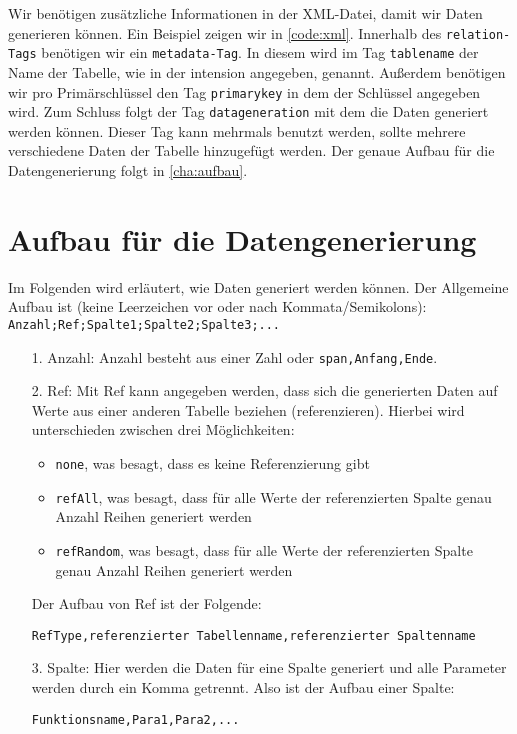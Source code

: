 \documentclass[11pt]{report}
\begin{document}
Wir benötigen zusätzliche Informationen in der XML-Datei, damit wir Daten generieren können. Ein Beispiel zeigen wir in \autoref{code:xml}. Innerhalb des \texttt{relation-Tags} benötigen wir ein \texttt{metadata-Tag}. In diesem wird im Tag \texttt{tablename} der Name der Tabelle, wie in der intension angegeben, genannt. Außerdem benötigen wir pro Primärschlüssel den Tag \texttt{primarykey} in dem der Schlüssel angegeben wird. Zum Schluss folgt der Tag \texttt{datageneration} mit dem die Daten generiert werden können. Dieser Tag kann mehrmals benutzt werden, sollte mehrere verschiedene Daten der Tabelle hinzugefügt werden. Der genaue Aufbau für die Datengenerierung folgt in \autoref{cha:aufbau}.

\begin{figure}[h]
	\centering
	\begin{minipage}{0.9\textwidth}
		
	\end{minipage}
\end{figure}


\section{Aufbau für die Datengenerierung}
\label{cha:aufbau}

Im Folgenden wird erläutert, wie Daten generiert werden können. Der Allgemeine Aufbau ist (keine Leerzeichen vor oder nach Kommata/Semikolons):\\

\texttt{Anzahl;Ref;Spalte1;Spalte2;Spalte3;...}

\begin{itemize}
\item[1.] Anzahl: Anzahl besteht aus einer Zahl oder \texttt{span,Anfang,Ende}.
\item[2.] Ref: Mit Ref kann angegeben werden, dass sich die generierten Daten auf Werte aus einer anderen Tabelle beziehen (referenzieren). Hierbei wird unterschieden zwischen drei Möglichkeiten:
\begin{itemize}
\item \texttt{none}, was besagt, dass es keine Referenzierung gibt
\item \texttt{refAll}, was besagt, dass für alle Werte der referenzierten Spalte genau Anzahl Reihen generiert werden
\item \texttt{refRandom}, was besagt, dass für alle Werte der referenzierten Spalte genau Anzahl Reihen generiert werden
\end{itemize}
Der Aufbau von Ref ist der Folgende:

\texttt{RefType,referenzierter Tabellenname,referenzierter Spaltenname}

\item[3.] Spalte: Hier werden die Daten für eine Spalte generiert und alle Parameter werden durch ein Komma getrennt. Also ist der Aufbau einer Spalte:

\texttt{Funktionsname,Para1,Para2,...}

\end{itemize}
\end{document}
